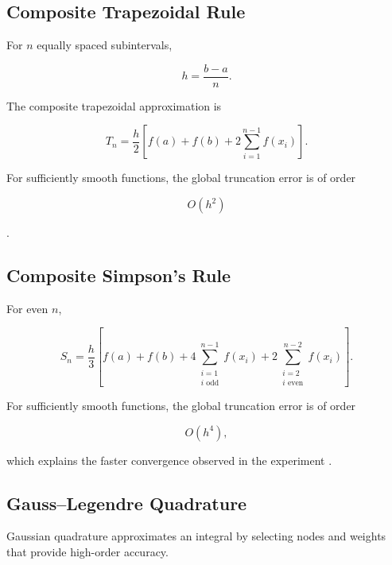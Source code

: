 \documentclass[11pt,a4paper]{article}
\begin{document}

\subsection{Composite Trapezoidal Rule}

For $n$ equally spaced subintervals,

\[
h=\frac{b-a}{n}.
\]

The composite trapezoidal approximation is

\[
T_n
=
\frac{h}{2}
\left[
f(a)+f(b)
+
2\sum_{i=1}^{n-1}f(x_i)
\right].
\]

For sufficiently smooth functions, the global truncation error is of
order

\[
O(h^2)
\]

\cite{burden2010,chapra2015}.


\subsection{Composite Simpson's Rule}

For even $n$,

\[
S_n
=
\frac{h}{3}
\left[
f(a)+f(b)
+
4\sum_{\substack{i=1\\i\text{ odd}}}^{n-1}
f(x_i)
+
2\sum_{\substack{i=2\\i\text{ even}}}^{n-2}
f(x_i)
\right].
\]

For sufficiently smooth functions, the global truncation error is of order

\[
O(h^4),
\]

which explains the faster convergence observed in the experiment
\cite{burden2010,chapra2015}.


\subsection{Gauss--Legendre Quadrature}

Gaussian quadrature approximates an integral by selecting nodes and weights
that provide high-order accuracy.
\end{document}

